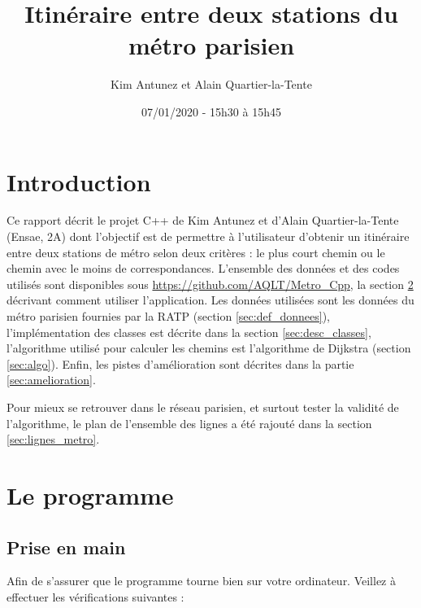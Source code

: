 \documentclass[,french]{article}
\title{Itinéraire entre deux stations du métro parisien}
\author{Kim Antunez et Alain Quartier-la-Tente}
\date{07/01/2020 - 15h30 à 15h45}
\begin{document}
\maketitle

{
\hypersetup{linkcolor=}
\setcounter{tocdepth}{2}
\tableofcontents
}
\hypertarget{introduction}{%
\section{Introduction}\label{introduction}}

Ce rapport décrit le projet C++ de Kim Antunez et d'Alain
Quartier-la-Tente (Ensae, 2A) dont l'objectif est de permettre à
l'utilisateur d'obtenir un itinéraire entre deux stations de métro selon
deux critères : le plus court chemin ou le chemin avec le moins de
correspondances. L'ensemble des données et des codes utilisés sont
disponibles sous \url{https://github.com/AQLT/Metro_Cpp}, la section
\ref{sec:le_programme} décrivant comment utiliser l'application. Les
données utilisées sont les données du métro parisien fournies par la
RATP (section \ref{sec:def_donnees}), l'implémentation des classes est
décrite dans la section \ref{sec:desc_classes}, l'algorithme utilisé
pour calculer les chemins est l'algorithme de Dijkstra (section
\ref{sec:algo}). Enfin, les pistes d'amélioration sont décrites dans la
partie \ref{sec:amelioration}.

Pour mieux se retrouver dans le réseau parisien, et surtout tester la
validité de l'algorithme, le plan de l'ensemble des lignes a été rajouté
dans la section \ref{sec:lignes_metro}.

\hypertarget{sec:le_programme}{%
\section{Le programme}\label{sec:le_programme}}

\hypertarget{prise-en-main}{%
\subsection{Prise en main}\label{prise-en-main}}

Afin de s'assurer que le programme tourne bien sur votre ordinateur.
Veillez à effectuer les vérifications suivantes :
\end{document}
